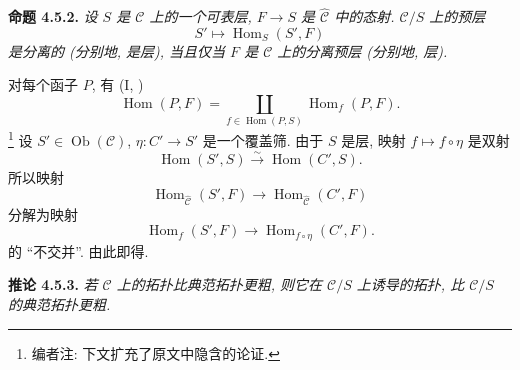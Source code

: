 
\medskip
\noindent{}\textbf{命题 4.5.2.}
\textit{设 \(S\) 是 \(\mathscr C\) 上的一个可表层,
\(F\to S\) 是 \(\widehat{\mathscr C}\) 中的态射.
\(\mathscr C/S\) 上的预层
\[
  S'\longmapsto \operatorname{Hom}_{S}(S',F)
\]
是分离的 (分别地, 是层), 当且仅当 \(F\) 是 \(\mathscr C\)
上的分离预层 (分别地, 层).}

对每个函子 \(P\), 有 (I, )
\[
  \operatorname{Hom}(P,F)
  =\coprod_{f\in\operatorname{Hom}(P,S)}
    \operatorname{Hom}_{f}(P,F).
\]
\footnote{编者注: 下文扩充了原文中隐含的论证.}
设 \(S'\in\operatorname{Ob}(\mathscr C)\),
\(\eta:C'\to S'\) 是一个覆盖筛.
由于 \(S\) 是层, 映射 \(f\mapsto f\circ\eta\) 是双射
\[
  \operatorname{Hom}(S',S)\xrightarrow{\sim}
  \operatorname{Hom}(C',S).
\]
所以映射
\[
  \operatorname{Hom}_{\widehat{\mathscr C}}(S',F)
  \longrightarrow
  \operatorname{Hom}_{\widehat{\mathscr C}}(C',F)
\]
分解为映射
\[
  \operatorname{Hom}_{f}(S',F)
  \longrightarrow
  \operatorname{Hom}_{f\circ\eta}(C',F).
\]
的 ``不交并''. 由此即得.

\medskip
\noindent{}\textbf{推论 4.5.3.}
\textit{若 \(\mathscr C\) 上的拓扑比典范拓扑更粗,
则它在 \(\mathscr C/S\) 上诱导的拓扑,
比 \(\mathscr C/S\) 的典范拓扑更粗.}

